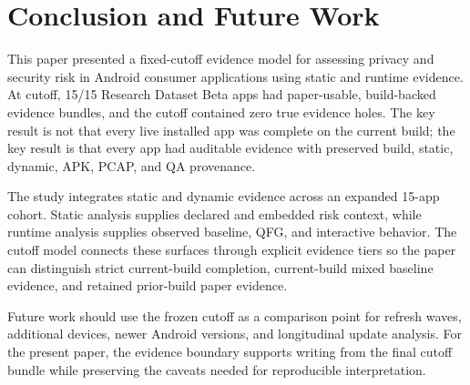 \section{Conclusion and Future Work}

This paper presented a fixed-cutoff evidence model for assessing privacy and security risk in Android consumer applications using static and runtime evidence. At cutoff, 15/15 Research Dataset Beta apps had paper-usable, build-backed evidence bundles, and the cutoff contained zero true evidence holes. The key result is not that every live installed app was complete on the current build; the key result is that every app had auditable evidence with preserved build, static, dynamic, APK, PCAP, and QA provenance.

The study integrates static and dynamic evidence across an expanded 15-app cohort. Static analysis supplies declared and embedded risk context, while runtime analysis supplies observed baseline, QFG, and interactive behavior. The cutoff model connects these surfaces through explicit evidence tiers so the paper can distinguish strict current-build completion, current-build mixed baseline evidence, and retained prior-build paper evidence.

Future work should use the frozen cutoff as a comparison point for refresh waves, additional devices, newer Android versions, and longitudinal update analysis. For the present paper, the evidence boundary supports writing from the final cutoff bundle while preserving the caveats needed for reproducible interpretation.
